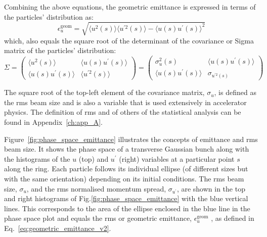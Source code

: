 Combining the above equations, the geometric emittance is expressed in terms of the particles' distribution as:
\begin{equation}\label{eq:geometric_emittance_v2}
    \epsilon^{\mathrm{geom}}_u = \sqrt{\langle u^2(s) \rangle \langle u^{\prime 2}(s) \rangle- \langle u (s)u^{\prime}(s) \rangle ^2}
\end{equation}
which, also equals the square root of the determinant of the covariance or Sigma matrix of the particles' distribution:
\begin{equation}\label{eq:Sigma_matrix_particles}
    \Sigma = \begin{pmatrix}
        \langle u^2(s) \rangle & \langle u(s) u^\prime(s) \rangle \\ 
        \langle u(s) u^\prime(s) \rangle & \langle u^{\prime 2}(s) \rangle 
        \end{pmatrix}  = \begin{pmatrix}
            \sigma_u^2(s) & \langle u(s) u^\prime(s) \rangle \\ 
            \langle u(s) u^\prime(s) \rangle & \sigma_{u^{\prime 2}(s)} 
            \end{pmatrix} 
\end{equation}

The square root of the top-left element of the covariance matrix, $\sigma_u$, is defined as the rms beam size and is also a variable that is used extensively in accelerator physics. The definition of rms and of others of the statistical analysis can be found in Appendix~\ref{ch:app_A}.

Figure~\ref{fig:phase_space_emittance} illustrates the concepts of emittance and rms beam size. It shows the phase space of a transverse Gaussian bunch along with the histograms of the $u$ (top) and $u^\prime$ (right) variables at a particular point $s$ along the ring. Each particle follows its individual ellipse (of different sizes but with the same orientation) depending on its initial conditions. The rms beam size, $\sigma_u$, and the rms normalised momentum spread, $\sigma_{u^\prime}$, are shown in the top and right histograms of Fig.\ref{fig:phase_space_emittance} with the blue vertical lines. This corresponds to the area of the ellipse enclosed in the blue line in the phase space plot and equals the rms or geometric emittance, $\epsilon^{\mathrm{geom}}_u$ , as defined in Eq.~\eqref{eq:geometric_emittance_v2}.

